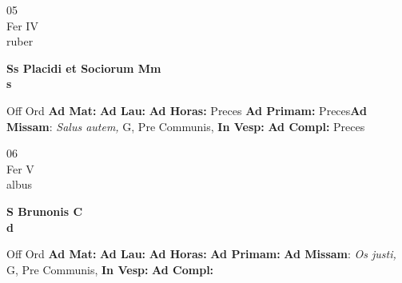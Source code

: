 \documentclass[10pt, openany]{book}
\begin{document}
        \begin{center}
            \begin{minipage}{3.5in}
                \vspace{2em}
                \begin{minipage}{0.5in}
                    {\Huge 05} \\
                    {\normalsize Fer IV} \\
                    {\normalsize ruber}
                \end{minipage}
                \begin{minipage}{3.0in}
                    \textbf{ \large Ss Placidi et Sociorum Mm \\
                    \textnormal{\normalsize s}} \\ 
                \end{minipage}
                \begin{justify}Off Ord
                    \textbf{Ad Mat: }
                    \textbf{Ad Lau: }
                    \textbf{Ad Horas: }Preces
                    \textbf{Ad Primam: }Preces\textbf{Ad Missam}: \textit{Salus autem,} G, Pre Communis,  
                    \textbf{In Vesp: }
                    \textbf{Ad Compl: }Preces
                \end{justify}
            \end{minipage}
        \end{center}
    
        \begin{center}
            \begin{minipage}{3.5in}
                \vspace{2em}
                \begin{minipage}{0.5in}
                    {\Huge 06} \\
                    {\normalsize Fer V} \\
                    {\normalsize albus}
                \end{minipage}
                \begin{minipage}{3.0in}
                    \textbf{ \large S Brunonis C \\
                    \textnormal{\normalsize d}} \\ 
                \end{minipage}
                \begin{justify}Off Ord
                    \textbf{Ad Mat: }
                    \textbf{Ad Lau: }
                    \textbf{Ad Horas: }
                    \textbf{Ad Primam: }\textbf{Ad Missam}: \textit{Os justi,} G, Pre Communis,  
                    \textbf{In Vesp: }
                    \textbf{Ad Compl: }
                \end{justify}
            \end{minipage}
        \end{center}
    
\end{document}
